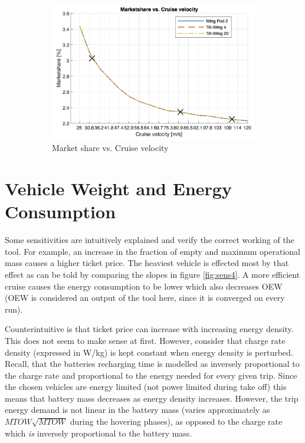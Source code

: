\begin{figure}[h]
\begin{subfigure}[t]{0.33\textwidth}
    \includegraphics[width=\textwidth]{Chapters/cruise_marketshare.png}
    \captionsetup{justification=centering}
    \caption{Market share vs. Cruise velocity}
    \label{fig:sens9}
\end{subfigure}
\captionsetup{justification=centering}
\caption{}
\label{fig:sens789}
\end{figure}

\section{Vehicle Weight and Energy Consumption}
Some sensitivities are intuitively explained and verify the correct working of the tool. For example, an increase in the fraction of empty and maximum operational mass causes a higher ticket price. The heaviest vehicle is effected most by that effect as can be told by comparing the slopes in figure \ref{fig:sens4}. A more efficient cruise causes the energy consumption to be lower which also decreases OEW (OEW is considered an output of the tool here, since it is converged on every run). 

Counterintuitive is that ticket price can increase with increasing energy density. This does not seem to make sense at first. However, consider that charge rate density (expressed in W/kg) is kept constant when energy density is perturbed. Recall, that the batteries recharging time is modelled as inversely proportional to the charge rate and proportional to the energy needed for every given trip. Since the chosen vehicles are energy limited (not power limited during take off) this means that battery mass decreases as energy density increases. However, the trip energy demand is not linear in the battery mass (varies approximately as $MTOW\sqrt{MTOW}$ during the hovering phases), as opposed to the charge rate which \emph{is} inversely proportional to the battery mass.

